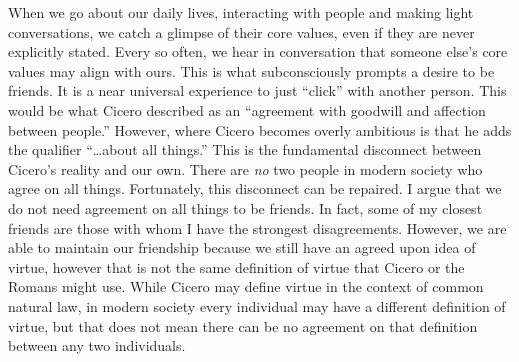\documentclass[12pt, letterpaper]{article}
\begin{document}
When we go about our daily lives, interacting with people and making light conversations, we catch a glimpse of 
their core values, even if they are never explicitly stated. Every so often, we hear in conversation that 
someone else’s core values may align with ours. This is what subconsciously prompts a desire to be friends. 
It is a near universal experience to just “click” with another person. This would be what Cicero described 
as an ``agreement with goodwill and affection between people.'' However, where Cicero becomes overly ambitious 
is that he adds the qualifier ``\ldots about all things.'' This is the fundamental disconnect between Cicero’s 
reality and our own. There are \emph{no} two people in modern society who agree on all things. Fortunately, this 
disconnect can be repaired. I argue that we do not need agreement on all things to be friends. In fact, some 
of my closest friends are those with whom I have the strongest disagreements. However, we are able to maintain our 
friendship because we still have an agreed upon idea of virtue, however that is not the same definition of 
virtue that Cicero or the Romans might use. While Cicero may define virtue in the context of common natural 
law, in modern society every individual may have a different definition of virtue, but that does not mean there 
can be no agreement on that definition between any two individuals. 

\newpage


\end{document}
